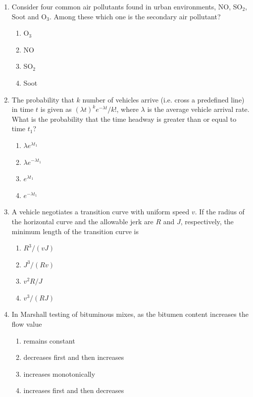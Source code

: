 \documentclass[journal,12pt,onecolumn]{IEEEtran}
\theoremstyle{remark}
\begin{document}
\begin{enumerate}
\item Consider four common air pollutants found in urban environments, NO, SO$_2$, Soot and O$_3$. Among these which one is the secondary air pollutant?

\hfill{}
\begin{enumerate}
\item O$_3$
\item NO
\item SO$_2$
\item Soot
\end{enumerate}

\item The probability that $k$ number of vehicles arrive (i.e. cross a predefined line) in time $t$ is given as $(\lambda t)^k e^{-\lambda t}/k!$, where $\lambda$ is the average vehicle arrival rate. What is the probability that the time headway is greater than or equal to time $t_1$?

\hfill{}
\begin{enumerate}
\item $\lambda e^{\lambda t_1}$
\item $\lambda e^{-\lambda t_1}$
\item $e^{\lambda t_1}$
\item $e^{-\lambda t_1}$
\end{enumerate}

\item A vehicle negotiates a transition curve with uniform speed $v$. If the radius of the horizontal curve and the allowable jerk are $R$ and $J$, respectively, the minimum length of the transition curve is

\hfill{}
\begin{enumerate}
\item $R^3/(vJ)$
\item $J^3/(Rv)$
\item $v^2 R/J$
\item $v^3/(RJ)$
\end{enumerate}

\item In Marshall testing of bituminous mixes, as the bitumen content increases the flow value

\hfill{}
\begin{enumerate}
\item remains constant
\item decreases first and then increases
\item increases monotonically
\item increases first and then decreases
\end{enumerate}


\end{enumerate}
\end{document}
